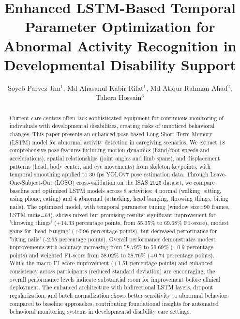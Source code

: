 \documentclass{iopconfser}
\begin{document}
\title{Enhanced LSTM-Based Temporal Parameter Optimization for Abnormal Activity Recognition in Developmental Disability Support}

\author{Soyeb Parvez Jim$^{1}$, Md Ahasanul Kabir Rifat$^{1}$, Md Atiqur Rahman Ahad$^{2}$, Tahera Hossain$^{3}$}



\begin{abstract}
Current care centers often lack sophisticated equipment for continuous monitoring of individuals with developmental disabilities, creating risks of unnoticed behavioral changes. This paper presents an enhanced pose-based Long Short-Term Memory (LSTM) model for abnormal activity detection in caregiving scenarios. We extract 18 comprehensive pose features including motion dynamics (hand/foot speeds and accelerations), spatial relationships (joint angles and limb spans), and displacement patterns (head, body center, and eye movements) from skeleton keypoints, with temporal smoothing applied to 30 fps YOLOv7 pose estimation data. Through Leave-One-Subject-Out (LOSO) cross-validation on the ISAS 2025 dataset, we compare baseline and optimized LSTM models across 8 activities: 4 normal (walking, sitting, using phone, eating) and 4 abnormal (attacking, head banging, throwing things, biting nails). The optimized model, with temporal parameter tuning (window size=90 frames, LSTM units=64), shows mixed but promising results: significant improvement for 'throwing things' (+14.33 percentage points, from 55.35\% to 69.68\% F1-score), modest gains for 'head banging' (+0.96 percentage points), but decreased performance for 'biting nails' (-2.55 percentage points). Overall performance demonstrates modest improvements with accuracy increasing from 58.79\% to 59.69\% (+0.9 percentage points) and weighted F1-score from 58.02\% to 58.76\% (+0.74 percentage points). While the macro F1-score improvement (+1.51 percentage points) and enhanced consistency across participants (reduced standard deviation) are encouraging, the overall performance levels indicate substantial room for improvement before clinical deployment. The enhanced architecture with bidirectional LSTM layers, dropout regularization, and batch normalization shows better sensitivity to abnormal behaviors compared to baseline approaches, contributing foundational insights for automated behavioral monitoring systems in developmental disability care settings.
\end{abstract}
\end{document}
